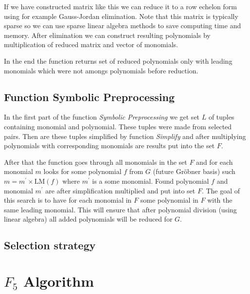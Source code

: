 If we have constructed matrix like this we can reduce it to a row echelon form using for example Gauss-Jordan elimination. Note that this matrix is typically sparse so we can use sparse linear algebra methods to save computing time and memory. After elimination we can construct resulting polynomials by multiplication of reduced matrix and vector of monomials.

In the end the function returns set of reduced polynomials only with leading monomials which were not amongs polynomials before reduction.

\subsection{Function Symbolic Preprocessing}
In the first part of the function \textit{Symbolic Preprocessing} we get set $L$ of tuples containing monomial and polynomial. These tuples were made from selected pairs. Then are these tuples simplified by function \textit{Simplify} and after multiplying polynomials with corresponding monomials are results put into the set $F$.

After that the function goes through all monomials in the set $F$ and for each monomial $m$ looks for some polynomial $f$ from $G$ (future Gr\"obner basis) such $m = m^\prime \times \textrm{LM}(f)$ where $m^\prime$ is a some monomial. Found polynomial $f$ and monomial $m^\prime$ are after simplification multiplied and put into set $F$. The goal of this search is to have for each monomial in $F$ some polynomial in $F$ with the same leading monomial. This will ensure that after polynomial division (using linear algebra) all added polynomials will be reduced for $G$.

\subsection{Selection strategy}
\label{subsec:F4:sel}

\section{$F_5$ Algorithm}
